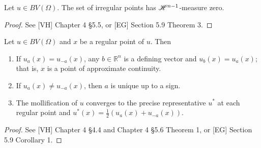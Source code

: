 %
%
%



\begin{theorem} \label{irregularpoints} Let $u \in BV(\Omega)$. The set of irregular points has $\mathscr{H}^{n-1}$-measure zero.
\end{theorem}

\begin{proof} See [VH] Chapter 4 §5.5, or [EG] Section 5.9 Theorem 3.
\end{proof}

\begin{theorem} \label{regularpoints} Let $u \in BV(\Omega)$ and $x$ be a regular point of $u$. Then
\begin{enumerate}
	\item If $u_{a}(x) = u_{-a}(x)$, any $b \in \mathbb{R}^{n}$ is a defining vector and $u_{b}(x) = u_{a}(x)$; that is, $x$ is a point of approximate continuity. 
	\item If $u_{a}(x) \neq u_{-a}(x)$, then $a$ is unique up to a sign.
	\item The mollification of $u$ converges to the precise representative $u^{*}$ at each regular point and $u^{*}(x) = \frac{1}{2} (u_{a}(x) + u_{-a}(x) )$.
\end{enumerate}
\end{theorem}
\begin{proof} See [VH] Chapter 4 §4.4 and Chapter 4 §5.6 Theorem 1, or [EG] Section 5.9 Corollary 1.
\end{proof}


